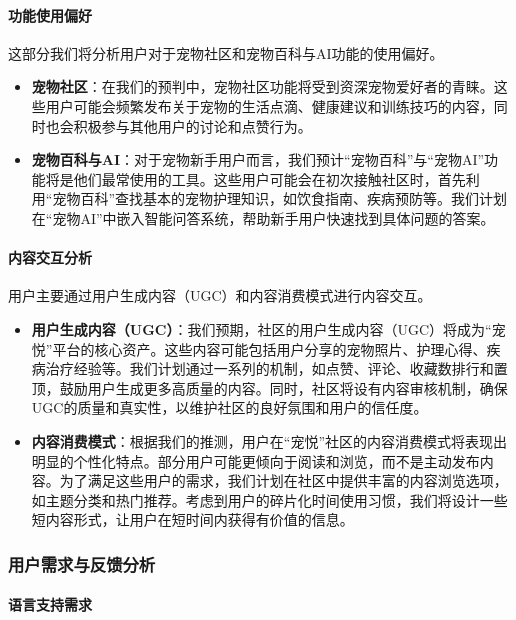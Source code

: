 \paragraph{功能使用偏好}

这部分我们将分析用户对于宠物社区和宠物百科与AI功能的使用偏好。

\begin{itemize}
	\item \textbf{宠物社区}：在我们的预判中，宠物社区功能将受到资深宠物爱好者的青睐。这些用户可能会频繁发布关于宠物的生活点滴、健康建议和训练技巧的内容，同时也会积极参与其他用户的讨论和点赞行为。
	\item \textbf{宠物百科与AI}：对于宠物新手用户而言，我们预计“宠物百科”与“宠物AI”功能将是他们最常使用的工具。这些用户可能会在初次接触社区时，首先利用“宠物百科”查找基本的宠物护理知识，如饮食指南、疾病预防等。我们计划在“宠物AI”中嵌入智能问答系统，帮助新手用户快速找到具体问题的答案。
\end{itemize}

\paragraph{内容交互分析}

用户主要通过用户生成内容（UGC）和内容消费模式进行内容交互。

\begin{itemize}
	\item \textbf{用户生成内容（UGC）}：我们预期，社区的用户生成内容（UGC）将成为“宠悦”平台的核心资产。这些内容可能包括用户分享的宠物照片、护理心得、疾病治疗经验等。我们计划通过一系列的机制，如点赞、评论、收藏数排行和置顶，鼓励用户生成更多高质量的内容。同时，社区将设有内容审核机制，确保UGC的质量和真实性，以维护社区的良好氛围和用户的信任度。
	\item \textbf{内容消费模式}：根据我们的推测，用户在“宠悦”社区的内容消费模式将表现出明显的个性化特点。部分用户可能更倾向于阅读和浏览，而不是主动发布内容。为了满足这些用户的需求，我们计划在社区中提供丰富的内容浏览选项，如主题分类和热门推荐。考虑到用户的碎片化时间使用习惯，我们将设计一些短内容形式，让用户在短时间内获得有价值的信息。
\end{itemize}

\subsubsection{用户需求与反馈分析}

\paragraph{语言支持需求}

